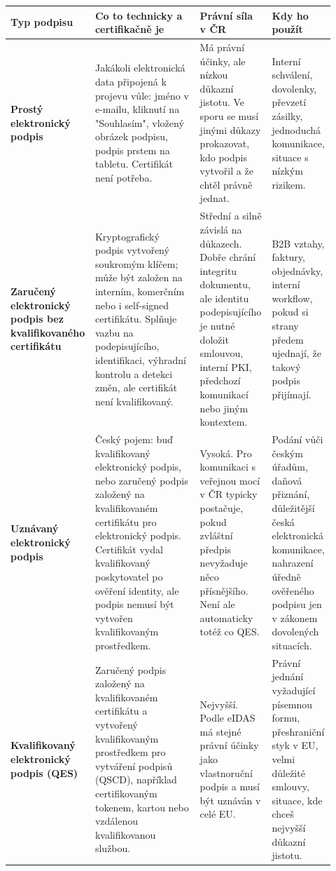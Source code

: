 \documentclass[11pt,a4paper]{article}
\begin{document}
\begin{longtable}{p{0.19\linewidth}p{0.32\linewidth}p{0.22\linewidth}p{0.19\linewidth}}
\toprule
\textbf{Typ podpisu} & \textbf{Co to technicky a certifikačně je} & \textbf{Právní síla v ČR} & \textbf{Kdy ho použít}\\
\midrule
\textbf{Prostý elektronický podpis} & Jakákoli elektronická data připojená k projevu vůle: jméno v e-mailu, kliknutí na "Souhlasím", vložený obrázek podpisu, podpis prstem na tabletu. Certifikát není potřeba. & Má právní účinky, ale nízkou důkazní jistotu. Ve sporu se musí jinými důkazy prokazovat, kdo podpis vytvořil a že chtěl právně jednat. & Interní schválení, dovolenky, převzetí zásilky, jednoduchá komunikace, situace s nízkým rizikem.\\
\addlinespace
\textbf{Zaručený elektronický podpis bez kvalifikovaného certifikátu} & Kryptografický podpis vytvořený soukromým klíčem; může být založen na interním, komerčním nebo i self-signed certifikátu. Splňuje vazbu na podepisujícího, identifikaci, výhradní kontrolu a detekci změn, ale certifikát není kvalifikovaný. & Střední a silně závislá na důkazech. Dobře chrání integritu dokumentu, ale identitu podepisujícího je nutné doložit smlouvou, interní PKI, předchozí komunikací nebo jiným kontextem. & B2B vztahy, faktury, objednávky, interní workflow, pokud si strany předem ujednají, že takový podpis přijímají.\\
\addlinespace
\textbf{Uznávaný elektronický podpis} & Český pojem: buď kvalifikovaný elektronický podpis, nebo zaručený podpis založený na kvalifikovaném certifikátu pro elektronický podpis. Certifikát vydal kvalifikovaný poskytovatel po ověření identity, ale podpis nemusí být vytvořen kvalifikovaným prostředkem. & Vysoká. Pro komunikaci s veřejnou mocí v ČR typicky postačuje, pokud zvláštní předpis nevyžaduje něco přísnějšího. Není ale automaticky totéž co QES. & Podání vůči českým úřadům, daňová přiznání, důležitější česká elektronická komunikace, nahrazení úředně ověřeného podpisu jen v zákonem dovolených situacích.\\
\addlinespace
\textbf{Kvalifikovaný elektronický podpis (QES)} & Zaručený podpis založený na kvalifikovaném certifikátu a vytvořený kvalifikovaným prostředkem pro vytváření podpisů (QSCD), například certifikovaným tokenem, kartou nebo vzdálenou kvalifikovanou službou. & Nejvyšší. Podle eIDAS má stejné právní účinky jako vlastnoruční podpis a musí být uznáván v celé EU. & Právní jednání vyžadující písemnou formu, přeshraniční styk v EU, velmi důležité smlouvy, situace, kde chceš nejvyšší důkazní jistotu.\\
\bottomrule
\end{longtable}
\end{document}
